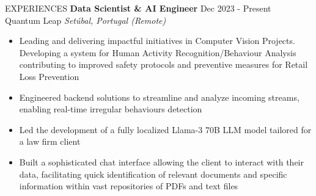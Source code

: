 \documentclass{resume} %
\begin{document}

\vspace{-6pt}
    \begin{rSection}{EXPERIENCES}
\textbf{Data Scientist \& AI Engineer} \hfill Dec 2023 - Present\\
Quantum Leap \hfill \textit{Setúbal, Portugal (Remote)}
\vspace{-5pt}
 \begin{itemize}
    \itemsep -6pt {}
     \item Leading and delivering impactful initiatives in Computer Vision Projects. Developing a system for Human Activity Recognition/Behaviour Analysis contributing to improved safety protocols and preventive measures for Retail Loss Prevention
    \item Engineered backend solutions to streamline and analyze incoming streams, enabling real-time irregular behaviours detection
    \item Led the development of a fully localized Llama-3 70B LLM model tailored for a law firm client
    \item Built a sophisticated chat interface allowing the client to interact with their data, facilitating quick identification of relevant documents and specific information within vast repositories of PDFs and text files
 \end{itemize}
 

\end{rSection}
\end{document}
